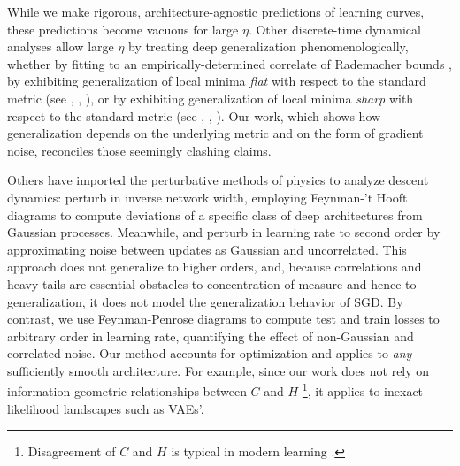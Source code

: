 \documentclass{article}
\theoremstyle{plain}
\theoremstyle{definition}
\begin{document}

    While we make rigorous, architecture-agnostic predictions of learning
    curves, these predictions become vacuous for large $\eta$. 
    Other discrete-time dynamical analyses allow large $\eta$ by treating deep
    generalization phenomenologically, whether by fitting to an
    empirically-determined correlate of Rademacher bounds \citep{li18}, by
    exhibiting generalization of local minima \emph{flat} with respect to the
    standard metric (see \citet{ho17}, \citet{ke17}, \citet{wa18}), or by
    exhibiting generalization of local minima \emph{sharp} with respect to the
    standard metric (see \citet{st56}, \citet{di17}, \citet{wu18}).  Our work,
    which shows how generalization depends on the underlying
    metric and on the form of gradient noise, reconciles those
    seemingly clashing claims.
    

    Others have imported the perturbative methods of physics to analyze descent
    dynamics:  \citet{dy19} perturb in inverse network width, employing Feynman-'t
    Hooft diagrams to compute deviations of a specific class of deep
    architectures from Gaussian processes.  Meanwhile, \cite{ch18} and
    \citet{li17} perturb in learning rate to second order by approximating
    noise between updates as Gaussian and uncorrelated.  This approach does not
    generalize to higher orders, and, because correlations and heavy tails are
    essential obstacles to concentration of measure and hence to
    generalization, it does not model the generalization behavior of SGD.  By
    contrast, we use Feynman-Penrose diagrams to compute test and train losses to
    arbitrary order in learning rate, quantifying the effect of non-Gaussian
    and correlated noise.  Our method accounts for optimization and applies to
    \emph{any} sufficiently smooth architecture.  For example, since our work
    does not rely on information-geometric relationships between $C$ and $H$
    \citep{am98}\footnote{
        Disagreement of $C$ and $H$ is typical in modern learning
        \citep{ro12, ku19}.
    }, it applies to inexact-likelihood landscapes such as
    VAEs'. 
\end{document}
